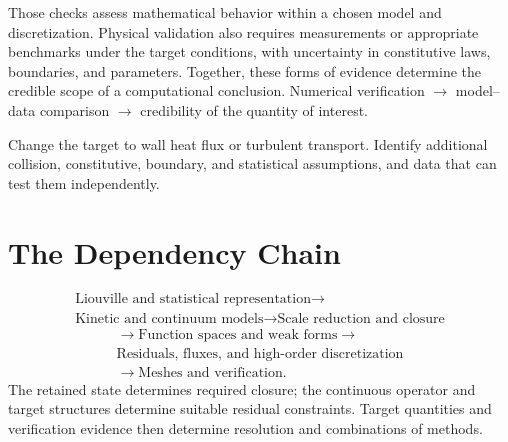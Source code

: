 {Those checks assess mathematical behavior within a chosen model and discretization. Physical validation also requires measurements or appropriate benchmarks under the target conditions,
with uncertainty in constitutive laws, boundaries, and parameters. Together, these forms of evidence determine the credible scope of a computational conclusion.}
{Numerical verification $\longrightarrow$ model--data comparison $\longrightarrow$ credibility of the quantity of interest.}

{Change the target to wall heat flux or turbulent transport. Identify additional collision, constitutive, boundary, and statistical assumptions, and data that can test them independently.}

\section{The Dependency Chain}
\[
\begin{gathered}
\text{Liouville and statistical representation}
\longrightarrow\\
\text{Kinetic and continuum models}
\longrightarrow\text{Scale reduction and closure}
\end{gathered}
\]
\[
\begin{gathered}
\longrightarrow\text{Function spaces and weak forms}
\longrightarrow\\
\text{Residuals, fluxes, and high-order discretization}\\
\longrightarrow\text{Meshes and verification}.
\end{gathered}
\]
The retained state determines required closure; the continuous operator and target structures determine suitable residual constraints.
Target quantities and verification evidence then determine resolution and combinations of methods.
